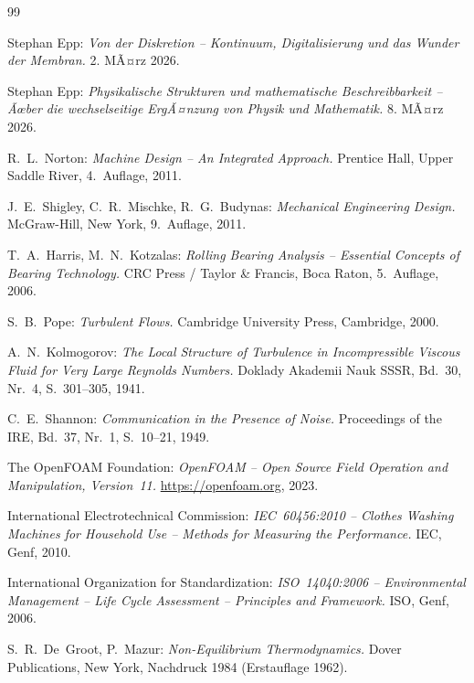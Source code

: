 ﻿\documentclass[12pt,a4paper]{article}
\theoremstyle{remark}
\begin{document}
	\begin{thebibliography}{99}
	
	Stephan Epp:
	\textit{Von der Diskretion -- Kontinuum, Digitalisierung und das Wunder der Membran.} 2. MÃ¤rz 2026.
	
	Stephan Epp:
	\textit{Physikalische Strukturen und mathematische Beschreibbarkeit --
	Ãœber die wechselseitige ErgÃ¤nzung von Physik und Mathematik.} 8. MÃ¤rz 2026.
	
	R.~L.~Norton:
	\textit{Machine Design -- An Integrated Approach.}
	Prentice Hall, Upper Saddle River, 4.~Auflage, 2011.
	
	J.~E.~Shigley, C.~R.~Mischke, R.~G.~Budynas:
	\textit{Mechanical Engineering Design.}
	McGraw-Hill, New York, 9.~Auflage, 2011.
	
	T.~A.~Harris, M.~N.~Kotzalas:
	\textit{Rolling Bearing Analysis -- Essential Concepts of Bearing Technology.}
	CRC Press / Taylor \& Francis, Boca Raton, 5.~Auflage, 2006.
	
	S.~B.~Pope:
	\textit{Turbulent Flows.}
	Cambridge University Press, Cambridge, 2000.
	
	A.~N.~Kolmogorov:
	\textit{The Local Structure of Turbulence in Incompressible Viscous Fluid for Very Large Reynolds Numbers.}
	Doklady Akademii Nauk SSSR, Bd.~30, Nr.~4, S.~301--305, 1941.
	
	C.~E.~Shannon:
	\textit{Communication in the Presence of Noise.}
	Proceedings of the IRE, Bd.~37, Nr.~1, S.~10--21, 1949.
	
	The OpenFOAM Foundation:
	\textit{OpenFOAM -- Open Source Field Operation and Manipulation, Version~11.}
	\url{https://openfoam.org}, 2023.
	
	International Electrotechnical Commission:
	\textit{IEC~60456:2010 -- Clothes Washing Machines for Household Use --
	Methods for Measuring the Performance.}
	IEC, Genf, 2010.
	
	International Organization for Standardization:
	\textit{ISO~14040:2006 -- Environmental Management -- Life Cycle Assessment --
	Principles and Framework.}
	ISO, Genf, 2006.
	
	S.~R.~De~Groot, P.~Mazur:
	\textit{Non-Equilibrium Thermodynamics.}
	Dover Publications, New York, Nachdruck 1984 (Erstauflage 1962).
	

\end{thebibliography}
\end{document}
